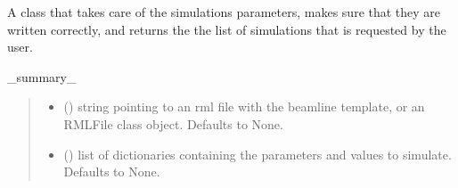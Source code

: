 \documentclass[letterpaper,10pt,english]{sphinxmanual}
\begin{document}
\begin{fulllineitems}
\label{\detokenize{index:raypyng.simulate.SimulationParams}}
\pysigstartsignatures
{}
\pysigstopsignatures
\sphinxAtStartPar
A class that takes care of the simulations parameters, makes sure that they are written correctly,
and returns the the list of simulations that is requested by the user.

\begin{fulllineitems}
\label{\detokenize{index:raypyng.simulate.SimulationParams.__init__}}
\pysigstartsignatures
{}
\pysigstopsignatures
\sphinxAtStartPar
\_summary\_
\begin{quote}\begin{description}
\begin{itemize}
\item {} 
\sphinxAtStartPar
{} (\sphinxstyleliteralemphasis{\sphinxupquote{, }}) \textendash{} string pointing to an rml file with the beamline template, or an RMLFile class object. Defaults to None.

\item {} 
\sphinxAtStartPar
{} (\sphinxstyleliteralemphasis{\sphinxupquote{, }}) \textendash{} list of dictionaries containing the parameters and values to simulate. Defaults to None.

\end{itemize}

\end{description}\end{quote}


\end{fulllineitems}
\end{fulllineitems}
\end{document}
